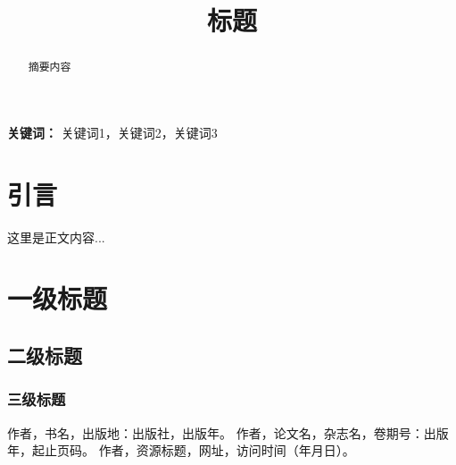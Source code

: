 \documentclass[12pt,a4paper]{article}
\title{\zihao{3}\heiti 标题}
\author{}
\date{}
\begin{document}
\maketitle
\vspace{-2.5cm}
\begin{abstract}
\vspace{-0.5cm}
\songti
摘要内容
\end{abstract}

\vspace{0cm}
\noindent%
\textbf{关键词：} 关键词1，关键词2，关键词3

\newpage

\section{引言}

这里是正文内容...

\section{一级标题}
\subsection{二级标题}
\subsubsection{三级标题}

\newpage
\begin{thebibliography}{99}
\songti
{} 作者，书名，出版地：出版社，出版年。
 作者，论文名，杂志名，卷期号：出版年，起止页码。
 作者，资源标题，网址，访问时间（年月日）。
\end{thebibliography}
\end{document}
